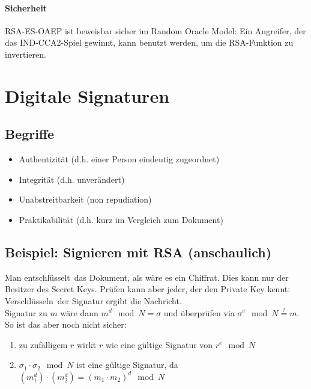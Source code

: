 \documentclass[a4paper,twoside,DIV15,BCOR12mm]{scrbook}
\begin{document}
\subsubsection{Sicherheit}

RSA-ES-OAEP ist beweisbar sicher im Random Oracle Model: Ein Angreifer, der das IND-CCA2-Spiel gewinnt, kann benutzt werden, um die RSA-Funktion zu invertieren.



\chapter{Digitale Signaturen} \label{digitale_signaturen}

\section{Begriffe}

\begin{itemize}	
	\item Authentizität (d.h. einer Person eindeutig zugeordnet)
	\item Integrität (d.h. unverändert)
	\item Unabstreitbarkeit (non repudiation)
	\item Praktikabilität (d.h. kurz im Vergleich zum Dokument)
\end{itemize}

\section{Beispiel: Signieren mit RSA (anschaulich)}

Man \glqq entschlüsselt\grqq\ das Dokument, als wäre es ein Chiffrat. Dies kann nur der Besitzer des Secret Keys. Prüfen kann aber jeder, der den Private Key kennt: \glqq Verschlüsseln\grqq\ der Signatur ergibt die Nachricht.\\ Signatur zu $m$ wäre dann $m^d \mod N = \sigma$ und überprüfen via $\sigma^e \mod N \stackrel{?}{=} m$.\\

So ist das aber noch nicht sicher:

\begin{enumerate}
	\item zu zufälligem $r$ wirkt $r$ wie eine gültige Signatur von $r^e \mod N$
	\item $\sigma_1 \cdot \sigma_2 \mod N$ ist eine gültige Signatur, da $(m_1^d) \cdot (m_2^d) = (m_1 \cdot m_2)^d \mod N$
\end{enumerate}
\end{document}
